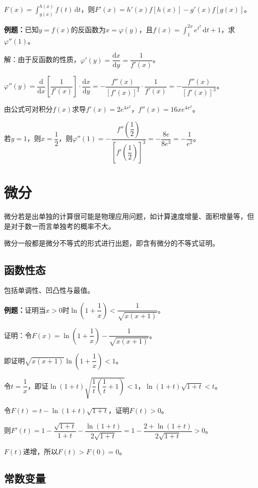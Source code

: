 \documentclass[UTF8, 12pt]{ctexart}
\begin{document}
$F(x)=\int_{g(x)}^{h(x)}f(t)\,\textrm{d}t$，则$F'(x)=h'(x)f[h(x)]-g'(x)f[g(x)]$。

\textbf{例题：}已知$y=f(x)$的反函数为$x=\varphi(y)$，且$f(x)=\int_1^{2x}e^{t^2}\,\textrm{d}t+1$，求$\varphi''(1)$。

解：由于反函数的性质，$\varphi'(y)=\dfrac{\textrm{d}x}{\textrm{d}y}=\dfrac{1}{f'(x)}$。

$\varphi''(y)=\dfrac{\textrm{d}}{\textrm{d}x}\left[\dfrac{1}{f'(x)}\right]\cdot\dfrac{\textrm{d}x}{\textrm{d}y}=-\dfrac{f''(x)}{[f'(x)]^2}\cdot\dfrac{1}{f'(x)}=-\dfrac{f''(x)}{[f'(x)]^3}$。

由公式可对积分$f(x)$求导$f'(x)=2e^{4x^2}$，$f''(x)=16xe^{4x^2}$。

若$y=1$，则$x=\dfrac{1}{2}$，则$\varphi''(1)=-\dfrac{f''\left(\dfrac{1}{2}\right)}{\left[f'\left(\dfrac{1}{2}\right)\right]^3}=-\dfrac{8e}{8e^3}=-\dfrac{1}{e^2}$。

\section{微分}

微分若是出单独的计算很可能是物理应用问题，如计算速度增量、面积增量等，但是对于数一而言单独考的概率不大。

微分一般都是微分不等式的形式进行出题，即含有微分的不等式证明。

\subsection{函数性态}

包括单调性、凹凸性与最值。

\textbf{例题：}证明当$x>0$时$\ln\left(1+\dfrac{1}{x}\right)<\dfrac{1}{\sqrt{x(x+1)}}$。

证明：令$F(x)=\ln\left(1+\dfrac{1}{x}\right)-\dfrac{1}{\sqrt{x(x+1)}}$。

即证明$\sqrt{x(x+1)}\ln\left(1+\dfrac{1}{x}\right)<1$。

令$t=\dfrac{1}{x}$，即证$\ln(1+t)\sqrt{\dfrac{1}{t}\left(\dfrac{1}{t}+1\right)}<1$，$\ln(1+t)\sqrt{1+t}<t$。

令$F(t)=t-\ln(1+t)\sqrt{1+t}$，证明$F(t)>0$。\medskip

则$F'(t)=1-\dfrac{\sqrt{1+t}}{1+t}-\dfrac{\ln(1+t)}{2\sqrt{1+t}}=1-\dfrac{2+\ln(1+t)}{2\sqrt{1+t}}>0$。

$F(t)$递增，所以$F(t)>F(0)=0$。

\subsection{常数变量}
\end{document}
